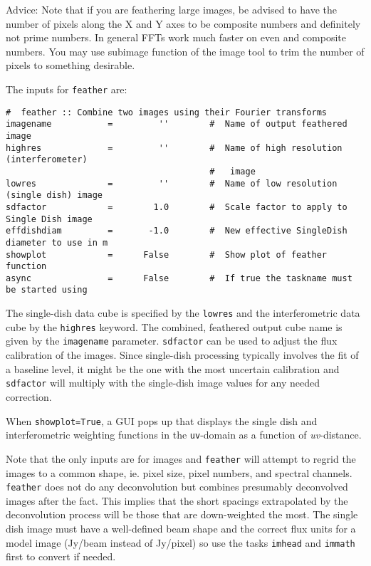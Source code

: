 Advice: Note that if you are feathering large images, be advised to
have the number of pixels along the X and Y axes to be composite
numbers and definitely not prime numbers. In general FFTs work much
faster on even and composite numbers. You may use subimage function of
the image tool to trim the number of pixels to something desirable.

The inputs for {\tt feather} are:
\small
\begin{verbatim}
#  feather :: Combine two images using their Fourier transforms
imagename           =         ''        #  Name of output feathered image
highres             =         ''        #  Name of high resolution (interferometer)
                                        #   image
lowres              =         ''        #  Name of low resolution (single dish) image
sdfactor            =        1.0        #  Scale factor to apply to Single Dish image
effdishdiam         =       -1.0        #  New effective SingleDish diameter to use in m
showplot            =      False        #  Show plot of feather function
async               =      False        #  If true the taskname must be started using
\end{verbatim}
\normalsize 


The single-dish data cube is specified by the {\tt lowres} and the
interferometric data cube by the {\tt highres} keyword. The combined,
feathered output cube name is given by the {\tt imagename}
parameter. {\tt sdfactor} can be used to adjust the flux calibration
of the images. Since single-dish processing typically involves the fit
of a baseline level, it might be the one with the most uncertain
calibration and {\tt sdfactor} will multiply with the single-dish
image values for any needed correction.

When {\tt showplot=True}, a GUI pops up that displays the single dish
and interferometric weighting functions in the {\tt uv}-domain as a function
of {\it uv}-distance.

Note that the only inputs are for images and {\tt feather} will
attempt to regrid the images to a common shape, ie. pixel size, pixel
numbers, and spectral channels. {\tt feather} does not do any
deconvolution but combines presumably deconvolved images after the
fact. This implies that the short spacings extrapolated by the
deconvolution process will be those that are down-weighted the
most. The single dish image must have a well-defined beam shape and
the correct flux units for a model image (Jy/beam instead of Jy/pixel)
so use the tasks {\tt imhead} and {\tt immath} first to convert if
needed.

